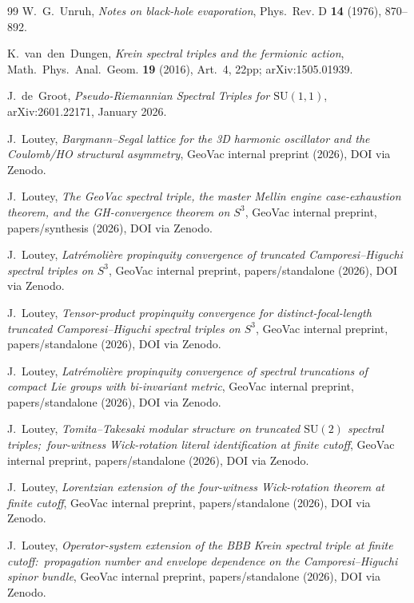 \documentclass[11pt,a4paper]{article}
\theoremstyle{plain}
\theoremstyle{definition}
\newcommand{\sthree}{S^{3}}
\newcommand{\SU}{\mathrm{SU}}
\begin{document}
\begin{thebibliography}{99}
W.~G.~Unruh,
\newblock \emph{Notes on black-hole evaporation},
\newblock Phys.~Rev. D \textbf{14} (1976), 870--892.

K.~van~den~Dungen,
\newblock \emph{Krein spectral triples and the fermionic action},
\newblock Math.~Phys.~Anal.~Geom. \textbf{19} (2016), Art.~4, 22pp;
\newblock arXiv:1505.01939.

J.~de~Groot,
\newblock \emph{Pseudo-Riemannian Spectral Triples for $\mathrm{SU}(1,1)$},
\newblock arXiv:2601.22171, January 2026.

J.~Loutey,
\newblock \emph{Bargmann--Segal lattice for the 3D harmonic oscillator
and the Coulomb/HO structural asymmetry},
\newblock GeoVac internal preprint (2026), DOI via Zenodo.

J.~Loutey,
\newblock \emph{The GeoVac spectral triple, the master Mellin engine
case-exhaustion theorem, and the GH-convergence theorem on $\sthree$},
\newblock GeoVac internal preprint, papers/synthesis (2026),
DOI via Zenodo.

J.~Loutey,
\newblock \emph{Latr\'emoli\`ere propinquity convergence of truncated
Camporesi--Higuchi spectral triples on $\sthree$},
\newblock GeoVac internal preprint, papers/standalone (2026),
DOI via Zenodo.

J.~Loutey,
\newblock \emph{Tensor-product propinquity convergence for
distinct-focal-length truncated Camporesi--Higuchi spectral triples on
$\sthree$},
\newblock GeoVac internal preprint, papers/standalone (2026),
DOI via Zenodo.

J.~Loutey,
\newblock \emph{Latr\'emoli\`ere propinquity convergence of spectral
truncations of compact Lie groups with bi-invariant metric},
\newblock GeoVac internal preprint, papers/standalone (2026),
DOI via Zenodo.

J.~Loutey,
\newblock \emph{Tomita--Takesaki modular structure on truncated
$\SU(2)$ spectral triples;\ four-witness Wick-rotation literal
identification at finite cutoff},
\newblock GeoVac internal preprint, papers/standalone (2026),
DOI via Zenodo.

J.~Loutey,
\newblock \emph{Lorentzian extension of the four-witness Wick-rotation
theorem at finite cutoff},
\newblock GeoVac internal preprint, papers/standalone (2026),
DOI via Zenodo.

J.~Loutey,
\newblock \emph{Operator-system extension of the BBB Krein spectral
triple at finite cutoff:\ propagation number and envelope dependence
on the Camporesi--Higuchi spinor bundle},
\newblock GeoVac internal preprint, papers/standalone (2026),
DOI via Zenodo.

\end{thebibliography}
\end{document}
